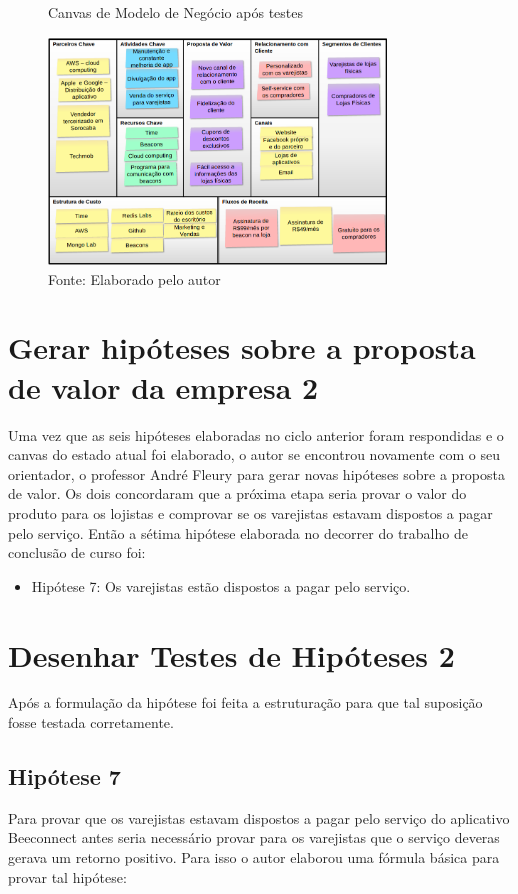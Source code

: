 \begin{figure}[H]
\caption{Canvas de Modelo de Negócio após testes}
\centerline{\includegraphics[width=0.8\textwidth]{img/canvas_beeconnect_2}}
\label{fig:canvas_beeconnect_2}
\caption* {Fonte: Elaborado pelo autor}
\end{figure}

\section{Gerar hipóteses sobre a proposta de valor da empresa 2}
\label{cha:gerar_hipoteses_ 2}
Uma vez que as seis hipóteses elaboradas no ciclo anterior foram respondidas e o canvas do estado atual foi elaborado, o autor se encontrou novamente com o seu orientador, o professor André Fleury para gerar novas hipóteses sobre a proposta de valor. Os dois concordaram que a próxima etapa seria provar o valor do produto para os lojistas e comprovar se os varejistas estavam dispostos a pagar pelo serviço. Então a sétima hipótese elaborada no decorrer do trabalho de conclusão de curso foi:
\begin{itemize}
\item Hipótese 7: Os varejistas estão dispostos a pagar pelo serviço.
\end{itemize}


\section{Desenhar Testes de Hipóteses 2}
\label{cha:desenhar_hipoteses_2}
Após a formulação da hipótese foi feita a estruturação para que tal suposição fosse testada corretamente.

\subsection{Hipótese 7}
\label{cha:hipotese_7}
Para provar que os varejistas estavam dispostos a pagar pelo serviço do aplicativo Beeconnect antes seria necessário provar para os varejistas que o serviço deveras gerava um retorno positivo. Para isso o autor elaborou uma fórmula básica para provar tal hipótese:

